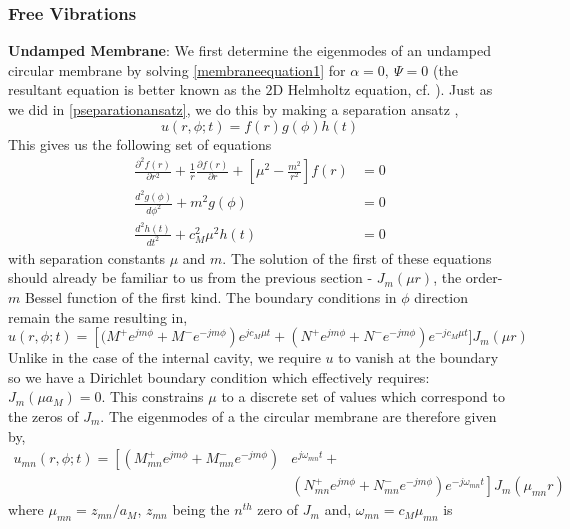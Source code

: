 \subsubsection*{Free Vibrations}
\noindent\textbf{Undamped Membrane}: We first determine the eigenmodes of an undamped circular membrane by solving \eqref{membraneequation1} for $\alpha=0,\ \Psi=0$
(the resultant equation is better known as the $2$D Helmholtz equation, cf. \cite[p.~187]{asmar2005partial}). Just as we did in \eqref{pseparationansatz},
we do this by making a separation ansatz ,
\begin{equation}\label{mseparationansatz}
 u(r,\phi;t)=f(r)g(\phi)h(t)
\end{equation}
This gives us the following set of equations
\begin{align}
 \frac{\partial^2 f(r)}{\partial r^2} + \frac{1}{r}\frac{\partial f(r)}{\partial r}+\left[\mu^2-\frac{m^2}{r^2}\right]f(r)&=0\label{besselequation2}\\
  \frac{d^2 g(\phi)}{d\phi^2}+m^2g(\phi)&=0\\
 \frac{d^2 h(t)}{dt^2}+c^2_M\mu^2h(t)&=0
\end{align}
with separation constants $\mu$ and $m$. The solution of the first of these equations should already be familiar to us from the previous section - $J_m(\mu r)$,
 the order-$m$ Bessel function of the first kind. The boundary conditions in $\phi$ direction remain the same resulting in,
\begin{equation}\label{specificmembrane1}
 u(r,\phi;t)=\left[(M^+e^{jm\phi}+M^-e^{-jm\phi}\right)e^{jc_M\mu t}+(N^+e^{jm\phi}+N^-e^{-jm\phi})e^{-jc_M\mu t}] J_m(\mu r)
\end{equation}
Unlike in the case of the internal cavity, we require $u$ to vanish at the boundary so we have a Dirichlet boundary condition which
effectively requires: $J_m(\mu a_M)=0$. This constrains $\mu$ to a discrete set of values which correspond to the zeros of $J_m$. The eigenmodes of a 
the circular membrane are therefore given by,
\begin{equation}\label{membraneeigen}
\begin{split}
 u_{mn}(r,\phi;t)=\left[(M^+_{mn}e^{jm\phi}+M^-_{mn}e^{-jm\phi})\right.& e^{j\omega_{mn} t}+ \\
 &\left.(N^+_{mn}e^{jm\phi}+N^-_{mn}e^{-jm\phi})e^{-j\omega_{mn} t}\right] J_m(\mu_{mn} r)
 \end{split}
\end{equation}
where $\mu_{mn}=z_{mn}/a_M$, $z_{mn}$ being the $n^{th}$ zero of $J_m$ and, $\omega_{mn}=c_M\mu_{mn}$ is
